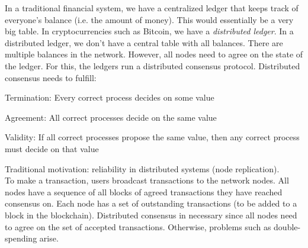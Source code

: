 \documentclass[11pt,oneside,a4paper]{article}
\begin{document}
In a traditional financial system, we have a centralized ledger that keeps track of everyone's balance (i.e. the amount of money). This would essentially be a very big table. In cryptocurrencies such as Bitcoin, we have a \textit{distributed ledger}. In a distributed ledger, we don't have a central table with all balances. There are multiple balances in the network. However, all nodes need to agree on the state of the ledger. For this, the ledgers run a distributed consensus protocol. Distributed consensus needs to fulfill:

\begin{compactitem}
	\item Termination: Every correct process decides on some value
	\item Agreement: All correct processes decide on the same value
	\item Validity: If all correct processes propose the same value, then any correct process must decide on that value
\end{compactitem}

Traditional motivation: reliability in distributed systems (node replication).\\

To make a transaction, users broadcast transactions to the network nodes. All nodes have a sequence of all blocks of agreed transactions they have reached consensus on. Each node has a set of outstanding transactions (to be added to a block in the blockchain). Distributed consensus in necessary since all nodes need to agree on the set of accepted transactions. Otherwise, problems such as double-spending arise.
\end{document}
